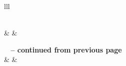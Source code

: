 \documentclass[10pt,a4paper]{article}
\author{js}
\begin{document}
	\begin{center}
		\begin{longtable}{lll}
			\caption[Feasible triples for a highly variable Grid]{Feasible triples for 
				highly variable Grid, MLMMH.} \label{grid_mlmmh} \\
			
			\hline {} &  &  \\ \hline 
			\endfirsthead
			
			{{\bfseries \tablename\ \thetable{} -- continued from previous page}} \\
			\hline {} &
			 &
			 \\ \hline 
			\endhead
			
			\hline {} \\ \hline
			\endfoot
			
			\hline \hline
			\endlastfoot
			

\end{longtable}
\end{center}
\end{document}
